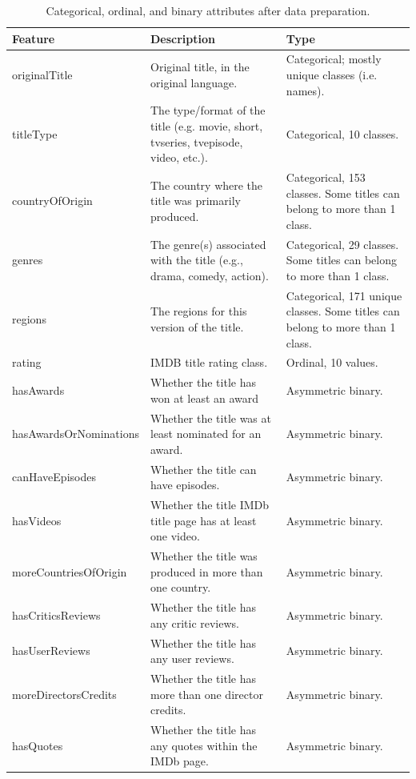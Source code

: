 \begin{table}[t]
    \centering
    \renewcommand{\arraystretch}{1.2}
    \scriptsize
    \begin{tabular}{p{2.5cm}p{7cm}p{4.5cm}}
    \toprule
    \textbf{Feature} & \textbf{Description} & \textbf{Type} \\ \midrule
    originalTitle & Original title, in the original language. & Categorical; mostly unique classes (i.e. names). \\
    titleType & The type/format of the title (e.g. movie, short, tvseries, tvepisode, video, etc.). & Categorical, 10 classes. \\
    countryOfOrigin & The country where the title was primarily produced. & Categorical, 153 classes. Some titles can belong to more than 1 class. \\
    genres & The genre(s) associated with the title (e.g., drama, comedy, action). & Categorical, 29 classes. Some titles can belong to more than 1 class. \\
    regions & The regions for this version of the title. & Categorical, 171 unique classes. Some titles can belong to more than 1 class. \\
    rating & IMDB title rating class. & Ordinal, 10 values. \\
    hasAwards & Whether the title has won at least an award & Asymmetric binary. \\
    hasAwardsOrNominations & Whether the title was at least nominated for an award. & Asymmetric binary. \\
    canHaveEpisodes & Whether the title can have episodes. & Asymmetric binary. \\
    hasVideos & Whether the title IMDb title page has at least one video. & Asymmetric binary. \\
    moreCountriesOfOrigin & Whether the title was produced in more than one country. & Asymmetric binary. \\
    hasCriticsReviews & Whether the title has any critic reviews. & Asymmetric binary. \\
    hasUserReviews & Whether the title has any user reviews. & Asymmetric binary. \\
    moreDirectorsCredits & Whether the title has more than one director credits. & Asymmetric binary. \\
    hasQuotes & Whether the title has any quotes within the IMDb page. & Asymmetric binary. \\ \bottomrule
    \end{tabular}
    \caption{Categorical, ordinal, and binary attributes after data preparation.}
    \label{tab:dataset_categorical}
\end{table}




